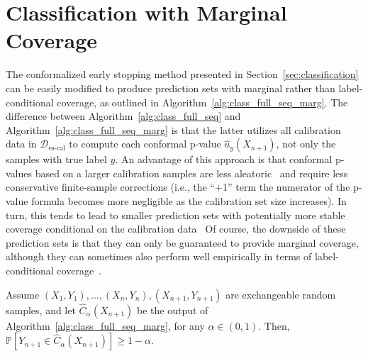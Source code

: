 \section{Classification with Marginal Coverage} \label{app:class-marg}

The conformalized early stopping method presented in Section~\ref{sec:classification} can be easily modified to produce prediction sets with marginal rather than label-conditional coverage, as outlined in Algorithm~\ref{alg:class_full_seq_marg}.
The difference between Algorithm~\ref{alg:class_full_seq}  and Algorithm~\ref{alg:class_full_seq_marg} is that the latter utilizes all calibration data in $\mathcal{D}_{\text{es-cal}}$ to compute each conformal p-value $\hat{u}_y(X_{n+1})$, not only the samples with true label $y$.
An advantage of this approach is that conformal p-values based on a larger calibration samples are less aleatoric~\cite{bates2021testing} and require less conservative finite-sample corrections (i.e., the ``+1'' term the numerator of the p-value formula becomes more negligible as the calibration set size increases).
In turn, this tends to lead to smaller prediction sets with potentially more stable coverage conditional on the calibration data~\cite{sesia2020comparison,bates2021testing}
Of course, the downside of these prediction sets is that they can only be guaranteed to provide marginal coverage, although they can sometimes also perform well empirically in terms of label-conditional coverage~\cite{romano2020classification}.

\begin{theorem} \label{thm:class_full_marg}
Assume $(X_{1},Y_{1}), \ldots, (X_{n},Y_{n}), (X_{n+1},Y_{n+1})$ are exchangeable random samples, and let $\hat{C}_{\alpha}(X_{n+1})$ be the output of Algorithm~\ref{alg:class_full_seq_marg}, for any $\alpha \in (0,1)$. 
Then, $\mathbb{P}[Y_{n+1} \in \hat{C}_{\alpha}(X_{n+1})] \geq 1-\alpha$.
\end{theorem}

